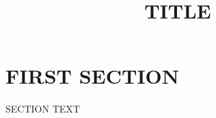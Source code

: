 \documentclass[12pt]{report}
\begin{document}
\title{TITLE}
\section{FIRST SECTION}
SECTION TEXT
\end{document}
